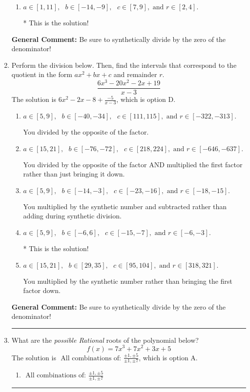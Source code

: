 \documentclass{extbook}[14pt]
\newcommand{\litem}[1]{\item #1

\rule{\textwidth}{0.4pt}}
\begin{document}
\begin{enumerate}
{\begin{enumerate}[label=\Alph*.]
 You divided by the opposite of the factor.
\item \( a \in [1, 11], \text{   } b \in [-14, -9], \text{   } c \in [7, 9], \text{   and   } r \in [2, 4]. \)

* This is the solution!
\end{enumerate}

\textbf{General Comment:} Be sure to synthetically divide by the zero of the denominator!
}
\litem{
Perform the division below. Then, find the intervals that correspond to the quotient in the form $ax^2+bx+c$ and remainder $r$.
\[ \frac{6x^{3} -20 x^{2} -2 x + 19}{x -3} \]The solution is \( 6x^{2} -2 x -8 + \frac{-5}{x -3} \), which is option D.\begin{enumerate}[label=\Alph*.]
\item \( a \in [5, 9], \text{   } b \in [-40, -34], \text{   } c \in [111, 115], \text{   and   } r \in [-322, -313]. \)

 You divided by the opposite of the factor.
\item \( a \in [15, 21], \text{   } b \in [-76, -72], \text{   } c \in [218, 224], \text{   and   } r \in [-646, -637]. \)

 You divided by the opposite of the factor AND multiplied the first factor rather than just bringing it down.
\item \( a \in [5, 9], \text{   } b \in [-14, -3], \text{   } c \in [-23, -16], \text{   and   } r \in [-18, -15]. \)

 You multiplied by the synthetic number and subtracted rather than adding during synthetic division.
\item \( a \in [5, 9], \text{   } b \in [-6, 6], \text{   } c \in [-15, -7], \text{   and   } r \in [-6, -3]. \)

* This is the solution!
\item \( a \in [15, 21], \text{   } b \in [29, 35], \text{   } c \in [95, 104], \text{   and   } r \in [318, 321]. \)

 You multiplied by the synthetic number rather than bringing the first factor down.
\end{enumerate}

\textbf{General Comment:} Be sure to synthetically divide by the zero of the denominator!
}
\litem{
What are the \textit{possible Rational} roots of the polynomial below?
\[ f(x) = 7x^{3} +7 x^{2} +3 x + 5 \]The solution is \( \text{ All combinations of: }\frac{\pm 1,\pm 5}{\pm 1,\pm 7} \), which is option A.\begin{enumerate}[label=\Alph*.]
\item \( \text{ All combinations of: }\frac{\pm 1,\pm 5}{\pm 1,\pm 7} \)


\end{enumerate}}
\end{enumerate}
\end{document}
